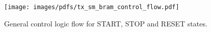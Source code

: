 \documentclass[]{article}
\begin{document}
    \begin{figure}[htbp]
        \centering
            \texttt{[image: images/pdfs/tx\_sm\_bram\_control\_flow.pdf]}
        \caption{General control logic flow for START, STOP and RESET states.}
        \label{fig:tx_sm_bram_control_flow}
    \end{figure}
    
    
    
\end{document}
